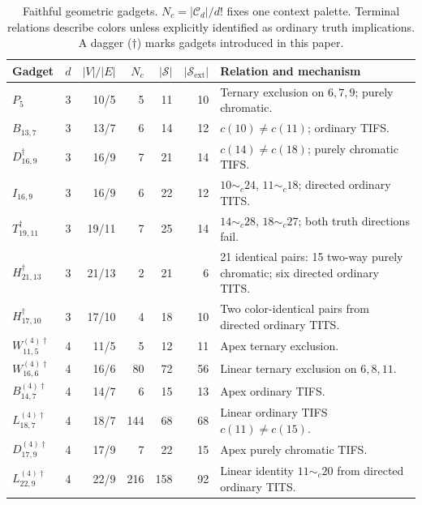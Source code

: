\documentclass[aps,pra,reprint,superscriptaddress,longbibliography,nofootinbib,floatfix,10pt]{revtex4-2}
\theoremstyle{definition}\newtheorem{definition}[theorem]{Definition}
\theoremstyle{remark}\newtheorem{remark}[theorem]{Remark}
\newcommand{\Sc}{\mathcal S}\newcommand{\Cc}{\mathcal C}
\begin{document}
\begin{table}[t]
\centering\small\setlength{\tabcolsep}{3pt}
\caption{Faithful geometric gadgets. $N_c=|\mathcal C_d|/d!$ fixes one context palette. Terminal relations describe colors unless explicitly identified as ordinary truth implications. A dagger ($\dagger$) marks gadgets introduced in this paper.}\label{tab:gadget-summary-combined}\label{tab:3dgadget-counts}\label{tab:4dgadget-counts}
\begin{tabular}{p{}rrrrrp{}}\toprule
Gadget & $d$ & $|V|/|E|$ & $N_c$ & $|\Sc|$ & $|\Sc_{\mathrm{ext}}|$ & Relation and mechanism\\\midrule
$P_5$ & 3 & 10/5 & 5 & 11 & 10 & Ternary exclusion on $6,7,9$; purely chromatic.\\
$B_{13,7}$ & 3 & 13/7 & 6 & 14 & 12 & $c(10)\ne c(11)$; ordinary TIFS.\\
$D_{16,9}^{\dagger}$ & 3 & 16/9 & 7 & 21 & 14 & $c(14)\ne c(18)$; purely chromatic TIFS.\\
$I_{16,9}$ & 3 & 16/9 & 6 & 22 & 12 & $10\sim_c24$, $11\sim_c18$; directed ordinary TITS.\\
$T_{19,11}^{\dagger}$ & 3 & 19/11 & 7 & 25 & 14 & $14\sim_c28$, $18\sim_c27$; both truth directions fail.\\
$H_{21,13}^{\dagger}$ & 3 & 21/13 & 2 & 21 & 6 & 21 identical pairs: 15 two-way purely chromatic; six directed ordinary TITS.\\
$H_{17,10}^{\dagger}$ & 3 & 17/10 & 4 & 18 & 10 & Two color-identical pairs from directed ordinary TITS.\\
$W_{11,5}^{(4)\dagger}$ & 4 & 11/5 & 5 & 12 & 11 & Apex ternary exclusion.\\
$W_{16,6}^{(4)\dagger}$ & 4 & 16/6 & 80 & 72 & 56 & Linear ternary exclusion on $6,8,11$.\\
$B_{14,7}^{(4)\dagger}$ & 4 & 14/7 & 6 & 15 & 13 & Apex ordinary TIFS.\\
$L_{18,7}^{(4)\dagger}$ & 4 & 18/7 & 144 & 68 & 68 & Linear ordinary TIFS $c(11)\ne c(15)$.\\
$D_{17,9}^{(4)\dagger}$ & 4 & 17/9 & 7 & 22 & 15 & Apex purely chromatic TIFS.\\
$L_{22,9}^{(4)\dagger}$ & 4 & 22/9 & 216 & 158 & 92 & Linear identity $11\sim_c20$ from directed ordinary TITS.\\
\bottomrule\end{tabular}
\end{table}
\end{document}
